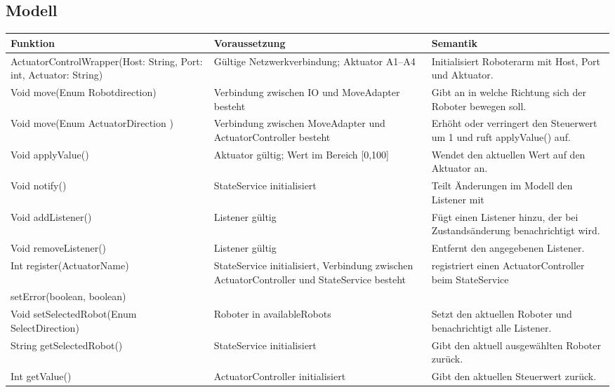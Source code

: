 \subsection{Modell}
\begin{table}[h!]
    \centering
    \begin{tabular}{|p{5cm}|p{5cm}|p{5cm}|}
        \hline
        \textbf{Funktion} & \textbf{Voraussetzung} & \textbf{Semantik} \\
        \hline
        ActuatorControlWrapper(Host: String, Port: int, Actuator: String) & Gültige Netzwerkverbindung; Aktuator A1–A4 & Initialisiert Roboterarm mit Host, Port und Aktuator. \\
        \hline
        Void move(Enum Robotdirection) & Verbindung zwischen IO und MoveAdapter besteht &  Gibt an in welche Richtung sich der Roboter bewegen soll. \\
        \hline
        Void move(Enum ActuatorDirection ) & Verbindung zwischen MoveAdapter und ActuatorController besteht & Erhöht oder verringert den Steuerwert um 1 und ruft applyValue() auf. \\
        \hline
        Void applyValue() & Aktuator gültig; Wert im Bereich [0,100] & Wendet den aktuellen Wert auf den Aktuator an. \\
		\hline
		Void notify() & StateService initialisiert & Teilt Änderungen im Modell den Listener mit \\
        \hline
        Void addListener() & Listener gültig & Fügt einen Listener hinzu, der bei Zustandsänderung benachrichtigt wird. \\
        \hline
        Void removeListener() & Listener gültig & Entfernt den angegebenen Listener. \\
        \hline
		Int register(ActuatorName) & StateService initialisiert, Verbindung zwischen ActuatorController und StateService besteht& registriert einen ActuatorController beim StateService \\
		\hline
		setError(boolean, boolean)& & \\
		\hline
        Void setSelectedRobot(Enum SelectDirection) & Roboter in availableRobots & Setzt den aktuellen Roboter und benachrichtigt alle Listener. \\
        \hline
        String getSelectedRobot() & StateService initialisiert & Gibt den aktuell ausgewählten Roboter zurück. \\
        \hline
        Int getValue() & ActuatorController initialisiert & Gibt den aktuellen Steuerwert zurück. \\

\end{tabular}
\end{table}
